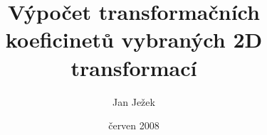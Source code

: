 \documentclass[a4paper,10pt,openany,oneside,notitlepage]{article}
\begin{document}
\title{\bf{Výpočet transformačních
koeficinetů vybraných 2D transformací}}

\author{Jan Ježek}

\date{červen 2008}

\maketitle

\vspace{30 pt}

\tableofcontents


		
		
        
\end{document}
